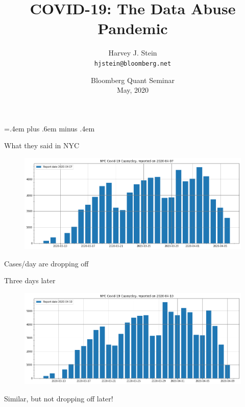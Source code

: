 \documentclass[aspectratio=169]{beamer}
\title{COVID-19: The Data Abuse Pandemic}
\author[Harvey J. Stein]{Harvey J. Stein\\\texttt{hjstein@bloomberg.net}}
\institute[Bloomberg LP]
{
  Head, Quantitative Risk Analytics\\
  Bloomberg L.P.
}
\date{Bloomberg Quant Seminar\\
  May, 2020}
\begin{document}
\nocite{nyc2020data,Stein2020nycdata,Stein2020owiddata,owid2020data}
\nocite{Stein2020Seem,Stein2020Ray,owid2020data,JHU2020data}
\nocite{NYT2020data}

\parskip=.4em plus .6em minus .4em

\begin{frame}

  \titlepage


\end{frame}

\begin{frame}{What they said in NYC}
  \begin{figure}
    \centering
    \includegraphics[width=1\textwidth]{../Notebooks/casesPerDay2020-04-07T17_52_37.000000000.png}
  \end{figure}
  Cases/day are dropping off
\end{frame}

\begin{frame}{Three days later}
  \begin{figure}
    \centering
    \includegraphics[width=1\textwidth]{../Notebooks/casesPerDay2020-04-10T17_41_39.000000000.png}
  \end{figure}
  Similar, but not dropping off later!
\end{frame}
\end{document}
